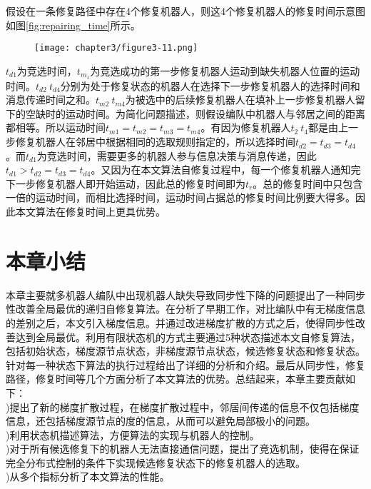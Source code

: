 假设在一条修复路径中存在4个修复机器人，则这4个修复机器人的修复时间示意图如图\ref{fig:repairing_time}所示。
\begin{figure}[!htbp]
	\centering
	\texttt{[image: chapter3/figure3-11.png]}
\end{figure}
$t_{d1}$为竞选时间，$t_{m_1}$为竞选成功的第一步修复机器人运动到缺失机器人位置的运动时间。$t_{d2}~t_{d4}$分别为处于修复状态的机器人在选择下一步修复机器人的选择时间和消息传递时间之和。$t_{m2}~t_{m4}$为被选中的后续修复机器人在填补上一步修复机器人留下的空缺时的运动时间。为简化问题描述，则假设编队中机器人与邻居之间的距离都相等。所以运动时间$t_{m1} = t_{m2} = t_{m3} = t_{m4}$。有因为修复机器人$t_2 ~ t_4$都是由上一步修复机器人在邻居中根据相同的选取规则指定的，所以选择时间$t_{d2} = t_{d3} = t_{d4}$。而$t_{d1}$为竞选时间，需要更多的机器人参与信息决策与消息传递，因此$t_{d1} > t_{d2} = t_{d3} = t_{d4}$。又因为在本文算法自修复过程中，每一个修复机器人通知完下一步修复机器人即开始运动，因此总的修复时间即为$t_r$。总的修复时间中只包含一倍的运动时间，而相比选择时间，运动时间占据总的修复时间比例要大得多。因此本文算法在修复时间上更具优势。

\section{本章小结}
本章主要就多机器人编队中出现机器人缺失导致同步性下降的问题提出了一种同步性改善全局最优的递归自修复算法。在分析了早期工作，对比编队中有无梯度信息的差别之后，本文引入梯度信息。并通过改进梯度扩散的方式之后，使得同步性改善达到全局最优。利用有限状态机的方式主要通过5种状态描述本文自修复算法，包括初始状态，梯度源节点状态，非梯度源节点状态，候选修复状态和修复状态。针对每一种状态下算法的执行过程给出了详细的分析和介绍。最后从同步性，修复路径，修复时间等几个方面分析了本文算法的优势。总结起来，本章主要贡献如下：\\
)提出了新的梯度扩散过程，在梯度扩散过程中，邻居间传递的信息不仅包括梯度信息，还包括梯度源节点的度的信息，从而可以避免局部极小的问题。\\
)利用状态机描述算法，方便算法的实现与机器人的控制。\\
)对于所有候选修复下的机器人无法直接通信问题，提出了竞选机制，使得在保证完全分布式控制的条件下实现候选修复状态下的修复机器人的选取。\\
)从多个指标分析了本文算法的性能。
